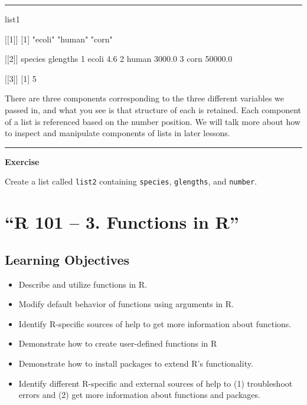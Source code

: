 \documentclass[
]{article}
\newenvironment{Shaded}{\begin{snugshade}}{\end{snugshade}}
\newcommand{\DecValTok}[1]{\textcolor[rgb]{0.00,0.00,0.81}{#1}}
\newcommand{\FloatTok}[1]{\textcolor[rgb]{0.00,0.00,0.81}{#1}}
\newcommand{\NormalTok}[1]{#1}
\newcommand{\StringTok}[1]{\textcolor[rgb]{0.31,0.60,0.02}{#1}}
\providecommand{\tightlist}{%
  \setlength{\itemsep}{0pt}\setlength{\parskip}{0pt}}
\begin{document}
\begin{center}\rule{0.5\linewidth}{0.5pt}\end{center}

\begin{Shaded}
\begin{Highlighting}[]
\NormalTok{list1}
    
\NormalTok{[[}\DecValTok{1}\NormalTok{]]}
\NormalTok{[}\DecValTok{1}\NormalTok{] }\StringTok{"ecoli"} \StringTok{"human"} \StringTok{"corn"} 

\NormalTok{[[}\DecValTok{2}\NormalTok{]]}
\NormalTok{  species glengths}
\DecValTok{1}\NormalTok{   ecoli      }\FloatTok{4.6}
\DecValTok{2}\NormalTok{   human   }\FloatTok{3000.0}
\DecValTok{3}\NormalTok{    corn  }\FloatTok{50000.0}

\NormalTok{[[}\DecValTok{3}\NormalTok{]]}
\NormalTok{[}\DecValTok{1}\NormalTok{] }\DecValTok{5}
\end{Highlighting}
\end{Shaded}

There are three components corresponding to the three different
variables we passed in, and what you see is that structure of each is
retained. Each component of a list is referenced based on the number
position. We will talk more about how to inspect and manipulate
components of lists in later lessons.

\begin{center}\rule{0.5\linewidth}{0.5pt}\end{center}

\textbf{Exercise}

Create a list called \texttt{list2} containing \texttt{species},
\texttt{glengths}, and \texttt{number}.

\hypertarget{r-101-3.-functions-in-r}{%
\section{``R 101 -- 3. Functions in R''}\label{r-101-3.-functions-in-r}}

\hypertarget{learning-objectives-1}{%
\subsection{Learning Objectives}\label{learning-objectives-1}}

\begin{itemize}
\tightlist
\item
  Describe and utilize functions in R.
\item
  Modify default behavior of functions using arguments in R.
\item
  Identify R-specific sources of help to get more information about
  functions.
\item
  Demonstrate how to create user-defined functions in R
\item
  Demonstrate how to install packages to extend R's functionality.
\item
  Identify different R-specific and external sources of help to (1)
  troubleshoot errors and (2) get more information about functions and
  packages.
\end{itemize}
\end{document}
